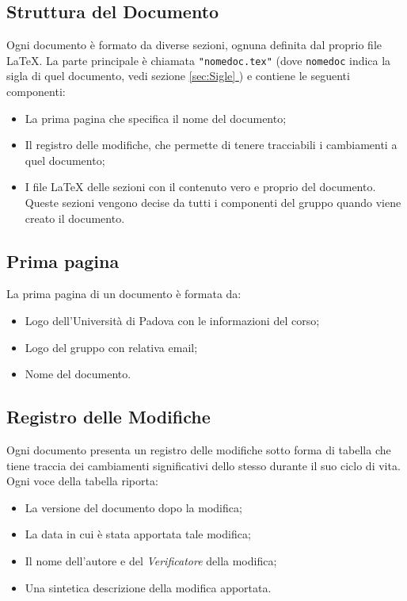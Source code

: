 \subsection{Struttura del Documento}
Ogni documento è formato da diverse sezioni, ognuna definita dal proprio file \LaTeX{}. La parte principale è chiamata \texttt{"nomedoc.tex"} (dove \texttt{nomedoc} indica la sigla di quel documento, vedi sezione \underline{\ref{sec:Sigle} }) e contiene le seguenti componenti:
\begin{itemize}
    \item La prima pagina che specifica il nome del documento;
    \item Il registro delle modifiche, che permette di tenere tracciabili i cambiamenti a quel documento;
    \item I file \LaTeX{} delle sezioni con il contenuto vero e proprio del documento. Queste sezioni vengono decise da tutti i componenti del gruppo quando viene creato il documento.
\end{itemize}
\subsection{Prima pagina}
La prima pagina di un documento è formata da:
\begin{itemize}
    \item Logo dell'Università di Padova con le informazioni del corso;
    \item Logo del gruppo con relativa email;
    \item Nome del documento.
\end{itemize}
\subsection{Registro delle Modifiche}
Ogni documento presenta un registro delle modifiche sotto forma di tabella che tiene traccia dei cambiamenti significativi dello stesso durante il suo ciclo di vita. Ogni voce della tabella riporta:
\begin{itemize}
    \item La versione del documento dopo la modifica;
    \item La data in cui è stata apportata tale modifica;
    \item Il nome dell'autore e del \textit{Verificatore} della modifica;
    \item Una sintetica descrizione della modifica apportata.
\end{itemize}
